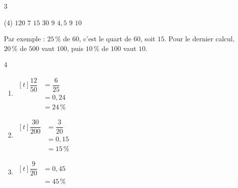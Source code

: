\documentclass[10pt,a4paper]{article}
\begin{document}
\begin{corr}{3}
\begin{tasks}(4)
    \task \(120\)
    \task \(7\)
    \task \(15\)
    \task \(30\)
    \task \(9\)
    \task \(4,5\)
    \task \(9\)
    \task \(10\)
\end{tasks}
Par exemple : \(25\,\%\) de \(60\), c'est le quart de \(60\), soit \(15\). Pour le dernier calcul, \(20\,\%\) de \(500\) vaut \(100\), puis \(10\,\%\) de \(100\) vaut \(10\).
\end{corr}

\begin{corr}{4}
\begin{enumerate}[leftmargin=*]
    \item \(\begin{aligned}[t] \dfrac{12}{50}&=\dfrac{6}{25}\\ &=0,24\\ &=24\,\%\end{aligned}\)
    \item \(\begin{aligned}[t] \dfrac{30}{200}&=\dfrac{3}{20}\\ &=0,15\\ &=15\,\%\end{aligned}\)
    \item \(\begin{aligned}[t] \dfrac{9}{20}&=0,45\\ &=45\,\%\end{aligned}\)
\end{enumerate}
\end{corr}
\end{document}
